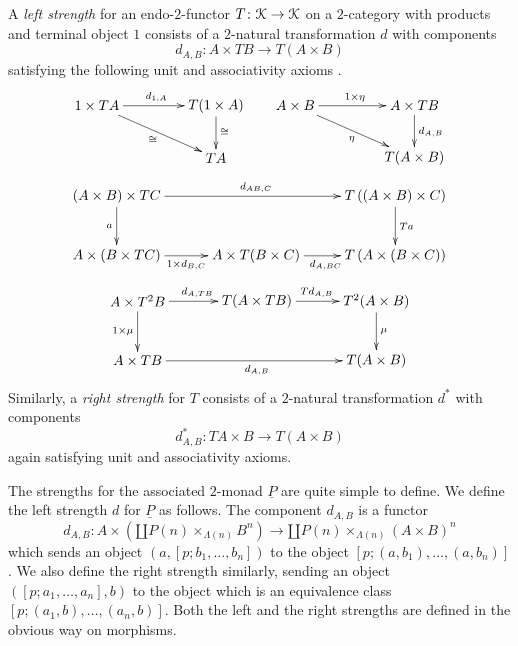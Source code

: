 \begin{Defi}\label{Defi:strengths}
A \textit{left strength} for an endo-$2$-functor $T \colon \mathcal{K} \rightarrow \mathcal{K}$ on a $2$-category with products and terminal object $1$ consists of a $2$-natural transformation $d$ with components
    \[
        d_{A,B} \colon A \times TB \rightarrow T(A \times B)
    \]
satisfying the following unit and associativity axioms \cite{kock-monads}.
  \[
    \xy
    (0,0)*+{1 \times TA}="ul1";
    (30,0)*+{T(1 \times A)}="ur1";
    (30,-13)*+{TA}="br1";
    (50,0)*+{A \times B}="ul2";
    (80,0)*+{A \times TB}="ur2";
    (80,-13)*+{T(A \times B)}="br2";
    {\ar^{d_{1,A}} "ul1"; "ur1"};
    {\ar^{\cong} "ur1"; "br1"};
    {\ar_{\cong} "ul1"; "br1"};
    {\ar^{1 \times \eta} "ul2"; "ur2"};
    {\ar^{d_{A,B}} "ur2"; "br2"};
    {\ar_{\eta} "ul2"; "br2"};
    \endxy
  \]
  \[
    \xy
    (0,0)*+{(A \times B) \times TC}="ul";
    (70,0)*+{T \left((A \times B) \times C \right)}="ur";
    (0,-15)*+{A \times (B \times TC)}="ll";
    (35,-15)*+{A \times T(B \times C)}="m";
    (70,-15)*+{ T \left(A \times (B \times C) \right)}="lr";
    {\ar^{d_{AB,C}} "ul"; "ur"};
    {\ar^{Ta} "ur"; "lr"};
    {\ar_{a} "ul"; "ll"};
    {\ar_{1 \times d_{B,C}} "ll"; "m"};
    {\ar_{d_{A,BC}} "m"; "lr"};
    \endxy
  \]
  \[
    \xy
    (0,0)*+{A \times T^{2}B}="ul";
    (60,0)*+{T^{2}(A \times B)}="ur";
    (0,-15)*+{A \times TB}="ll";
    (30,0)*+{T(A \times TB)}="m";
    (60,-15)*+{ T(A \times B)}="lr";
    {\ar^{d_{A,TB}} "ul"; "m"};
    {\ar^{Td_{A,B}} "m"; "ur"};
    {\ar^{\mu} "ur"; "lr"};
    {\ar_{1 \times \mu} "ul"; "ll"};
    {\ar_{d_{A,B}} "ll"; "lr"};
    \endxy
  \]
Similarly, a \emph{right strength} for $T$ consists of a $2$-natural transformation $d^{\ast}$ with components
  \[
      d^{\ast}_{A,B} \colon TA \times B \rightarrow T(A \times B)
  \]
again satisfying unit and associativity axioms.
\end{Defi}
The strengths for the associated $2$-monad $\underline{P}$ are quite simple to define. We define the left strength $d$ for $\underline{P}$ as follows. The component $d_{A,B}$ is a functor
    \[
        d_{A,B} \colon A \times \left(\amalg P(n) \times_{\Lambda(n)} B^n\right) \rightarrow \amalg P(n) \times_{\Lambda(n)} \left(A \times B \right)^n
    \]
which sends an object $(a, [p;b_1,\ldots,b_n])$ to the object $[p;(a,b_1),\ldots,(a,b_n)]$. We also define the right strength similarly, sending an object $([p;a_1,\ldots,a_n],b)$ to the object which is an equivalence class $[p;(a_1,b), \ldots, (a_n, b)]$. Both the left and the right strengths are defined in the obvious way on morphisms.

